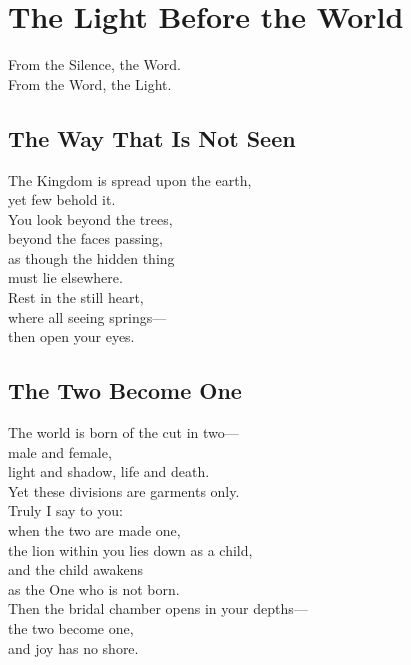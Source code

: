 \documentclass[10pt, openright]{book}
\newcommand{\sectionbreak}{\filbreak}
\newcommand{\sayingsource}[1]{\par\nopagebreak\vspace{0.3\baselineskip}{\raggedleft\footnotesize\itshape #1\par}}
\begin{document}
\mainmatter

\chapter{The Light Before the World}\label{the-light-before-the-world}

\begin{center}
From the Silence, the Word.\\
From the Word, the Light.
\end{center}

\sectionbreak

\section{The Way That Is Not Seen}\label{the-way-that-is-not-seen}

The Kingdom is spread upon the earth,\\
yet few behold it.\\
You look beyond the trees,\\
beyond the faces passing,\\
as though the hidden thing\\
must lie elsewhere.\\
Rest in the still heart,\\
where all seeing springs---\\
then open your eyes.

\sayingsource{Tao Te Ching 1 · Thomas 113}

\sectionbreak

\section{The Two Become One}\label{the-two-become-one}

The world is born of the cut in two---\\
male and female,\\
light and shadow, life and death.\\
Yet these divisions are garments only.\\
Truly I say to you:\\
when the two are made one,\\
the lion within you lies down as a child,\\
and the child awakens\\
as the One who is not born.\\
Then the bridal chamber opens in your depths---\\
the two become one,\\
and joy has no shore.
\end{document}
